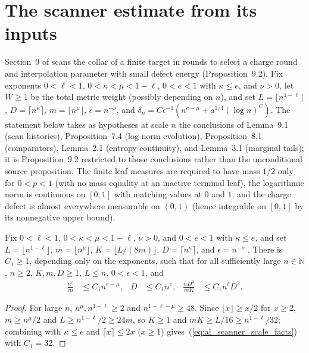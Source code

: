 \section{The scanner estimate from its inputs}
\label{sec:al_scanner}

Section~9 of \cite{OpenAI2026AreaLaw} scans the collar of a finite target in
rounds to select a charge round and interpolation parameter with small defect
energy (Proposition~9.2). Fix exponents $0<\ell<1$, $0<\kappa<\mu<1-\ell$,
$0<e<1$ with $\kappa\le e$, and $\nu>0$, let $W\ge1$ be the total metric weight
(possibly depending on $n$), and set $L=\lfloor n^{1-\ell}\rfloor$,
$D=\lceil n^\kappa\rceil$, $m=\lfloor n^\mu\rfloor$, $\epsilon=n^{-\nu}$, and
$\delta_n=C\epsilon^{-1}(n^{e-\mu}+a^{1/4}(\log n)^{C})$. The statement below
takes as hypotheses at scale $n$ the conclusions of Lemma~9.1 (scan histories),
Proposition~7.4 (log-norm evolution), Proposition~8.1 (comparators), Lemma~2.1
(entropy continuity), and Lemma~3.1 (marginal tails); it is Proposition~9.2
restricted to those conclusions rather than the unconditional source
proposition. The finite leaf measures are required to have mass $1/2$ only for
$0<p<1$ (with no mass equality at an inactive terminal leaf), the logarithmic
norm is continuous on $[0,1]$ with matching values at $0$ and $1$, and the
charge defect is almost everywhere measurable on $(0,1)$ (hence integrable on
$[0,1]$ by its nonnegative upper bound).

\begin{lemma}
    \label{lem:al_scanner_scale_facts}
    \leanok
    Fix $0<\ell<1$, $0<\kappa<\mu<1-\ell$, $\nu>0$, and $0<e<1$ with
    $\kappa\le e$, and set $L=\lfloor n^{1-\ell}\rfloor$,
    $m=\lfloor n^\mu\rfloor$, $K=\lfloor L/(8m)\rfloor$,
    $D=\lceil n^\kappa\rceil$, and $\epsilon=n^{-\nu}$
    \cite[Section~9]{OpenAI2026AreaLaw}. There is $C_1\ge1$, depending only on
    the exponents, such that for all sufficiently large $n\in\mathbb N$,
    $n\ge2$, $K,m,D\ge1$, $L\le n$, $0<\epsilon<1$, and
    \begin{align}
        \frac{n^e}{m}   & \le C_1n^{e-\mu},  &
        D               & \le C_1n^e,        &
        \frac{nD^2}{mK} & \le C_1n^\ell D^2.
        \label{eq:al_scanner_scale_facts}
    \end{align}
\end{lemma}
\begin{proof}\leanok
    For large $n$, $n^\mu,n^{1-\ell}\ge2$ and $n^{1-\ell-\mu}\ge48$. Since
    $\lfloor x\rfloor\ge x/2$ for $x\ge2$, $m\ge n^\mu/2$ and
    $L\ge n^{1-\ell}/2\ge24m$, so $K\ge1$ and $mK\ge L/16\ge n^{1-\ell}/32$;
    combining with $\kappa\le e$ and $\lceil x\rceil\le2x$ ($x\ge1$) gives~(\ref{eq:al_scanner_scale_facts})
    with $C_1=32$.
\end{proof}


